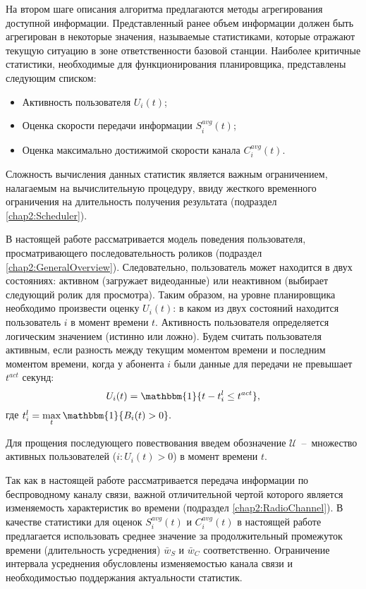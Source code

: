 На втором шаге описания алгоритма предлагаются методы агрегирования доступной информации. Представленный ранее объем информации должен быть агрегирован в некоторые значения, называемые статистиками, которые отражают текущую ситуацию в зоне ответственности базовой станции. Наиболее критичные статистики, необходимые для функционирования планировщика, представлены следующим списком:
\begin{itemize}
	\item Активность пользователя $U_i(t)$;
	\item Оценка скорости передачи информации $S_i^{avg}(t)$;
	\item Оценка максимально достижимой скорости канала $C_i^{avg}(t)$.
\end{itemize}
Сложность вычисления данных статистик является важным ограничением, налагаемым на вычислительную процедуру, ввиду жесткого временного ограничения на длительность получения результата (подраздел \ref{chap2:Scheduler}).

В настоящей работе рассматривается модель поведения пользователя, просматривающего последовательность роликов (подраздел \ref{chap2:GeneralOverview}). Следовательно, пользователь может находится в двух состояниях: активном (загружает видеоданные) или неактивном (выбирает следующий ролик для просмотра). Таким образом, на уровне планировщика необходимо произвести оценку $U_i(t)$: в каком из двух состояний находится пользователь $i$ в момент времени $t$. Активность пользователя определяется логическим значением (истинно или ложно). Будем считать пользователя активным, если разность между текущим моментом времени и последним моментом времени, когда у абонента $i$ были данные для передачи не превышает $t^{act}$ секунд:
\begin{equation}
	\label{eq:activityEstimation}
	U_i(t) = \mathbbm{1}\{t - t_i^{l} \leq t^{act}\},
\end{equation}
где $t_i^{l} = \max\limits_{t} \mathbbm{1}\{B_i(t) > 0\}.$

Для прощения последующего повествования введем обозначение $\mathcal{U}$~--~множество активных пользователей ($i:U_i(t) > 0$) в момент времени $t$. 

Так как в настоящей работе рассматривается передача информации по беспроводному каналу связи, важной отличительной чертой которого является изменяемость характеристик во времени (подраздел \ref{chap2:RadioChannel}). В качестве статистики для оценок $S_i^{avg}(t)$ и $C_i^{avg}(t)$ в настоящей работе предлагается использовать среднее значение за продолжительный промежуток времени (длительность усреднения) $\bar{w}_{S}$ и $\bar{w}_{C}$ соответственно. Ограничение интервала усреднения обусловлены изменяемостью канала связи и необходимостью поддержания актуальности статистик.

